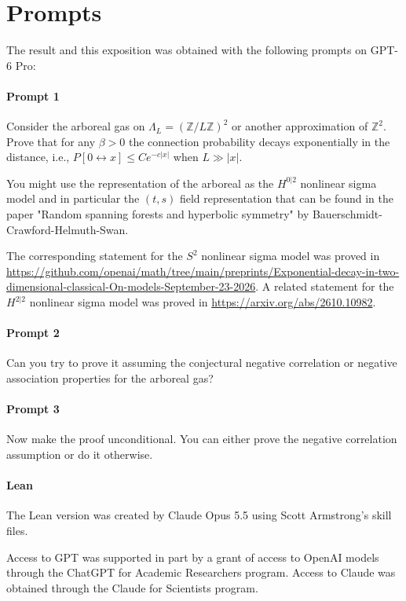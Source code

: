 \documentclass[11pt]{article}
\theoremstyle{definition}
\theoremstyle{remark}
\newcommand{\Z}{\mathbb{Z}}
\newcommand{\1}{\mathbf 1}
\begin{document}
\appendix
\section{Prompts}

The result and this exposition was obtained with the following prompts on GPT-6 Pro:

\paragraph{Prompt 1}
Consider the arboreal gas on $\Lambda_L= (\Z/L\Z)^2$ or another approximation of $\Z^2$. Prove that for any $\beta>0$ the connection probability decays exponentially in the distance, i.e., $P[0 \leftrightarrow x] \leq C e^{-c|x|}$ when $L \gg |x|$.

You might use the representation of the arboreal as the $H^{0|2}$ nonlinear sigma model and in particular the $(t,s)$ field representation that can be found in the paper "Random spanning forests and hyperbolic symmetry" by Bauerschmidt-Crawford-Helmuth-Swan.

The corresponding statement for the $S^2$ nonlinear sigma model was proved in \url{https://github.com/openai/math/tree/main/preprints/Exponential-decay-in-two-dimensional-classical-On-models-September-23-2026}. A related statement for the $H^{2|2}$ nonlinear sigma model was proved in \url{https://arxiv.org/abs/2610.10982}.

\paragraph{Prompt 2}
Can you try to prove it assuming the conjectural negative correlation or negative association properties for the arboreal gas?

\paragraph{Prompt 3}
Now make the proof unconditional. You can either prove the negative correlation assumption or do it otherwise.

\paragraph{Lean}
The Lean version was created by Claude Opus 5.5 using Scott Armstrong's skill files.
\bigskip

Access to GPT was supported in part by a grant of access to OpenAI models through the ChatGPT for Academic Researchers program.
Access to Claude was obtained through the Claude for Scientists program.
\end{document}
